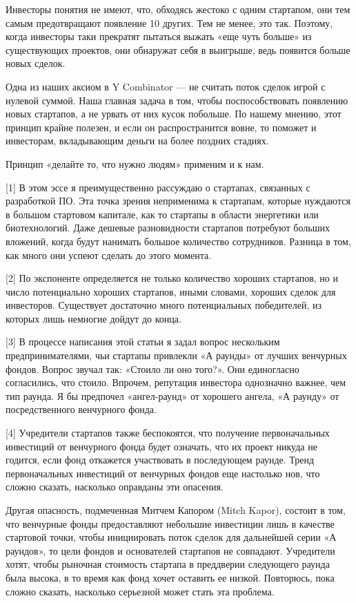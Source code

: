\documentclass[ebook,12pt,oneside,openany]{memoir}
\begin{document}
Инвесторы понятия не имеют, что, обходясь жестоко с одним стартапом,
они тем самым предотвращают появление 10 других. Тем не менее, это
так. Поэтому, когда инвесторы таки прекратят пытаться выжать «еще чуть
больше» из существующих проектов, они обнаружат себя в выигрыше, ведь
появится больше новых сделок.

Одна из наших аксиом в Y Combinator — не считать поток сделок игрой с
нулевой суммой. Наша главная задача в том, чтобы поспособствовать
появлению новых стартапов, а не урвать от них кусок побольше. По
нашему мнению, этот принцип крайне полезен, и если он распространится
вовне, то поможет и инвесторам, вкладывающим деньги на более поздних
стадиях.

Принцип «делайте то, что нужно людям» применим и к нам.

[1] В этом эссе я преимущественно рассуждаю о стартапах, связанных с
разработкой ПО. Эта точка зрения неприменима к стартапам, которые
нуждаются в большом стартовом капитале, как то стартапы в области
энергетики или биотехнологий. Даже дешевые разновидности стартапов
потребуют больших вложений, когда будут нанимать большое количество
сотрудников. Разница в том, как много они успеют сделать до этого
момента.

[2] По экспоненте определяется не только количество хороших стартапов,
но и число потенциально хороших стартапов, иными словами, хороших
сделок для инвесторов. Существует достаточно много потенциальных
победителей, из которых лишь немногие дойдут до конца.

[3] В процессе написания этой статьи я задал вопрос нескольким
предпринимателями, чьи стартапы привлекли «А раунды» от лучших
венчурных фондов. Вопрос звучал так: «Стоило ли оно того?». Они
единогласно согласились, что стоило. Впрочем, репутация инвестора
однозначно важнее, чем тип раунда. Я бы предпочел «ангел-раунд» от
хорошего ангела, «А раунду» от посредственного венчурного фонда.

[4] Учредители стартапов также беспокоятся, что получение
первоначальных инвестиций от венчурного фонда будет означать, что их
проект никуда не годится, если фонд откажется участвовать в
последующем раунде. Тренд первоначальных инвестиций от венчурных
фондов еще настолько нов, что сложно сказать, насколько оправданы эти
опасения.

Другая опасность, подмеченная Митчем Капором (Mitch Kapor), состоит в
том, что венчурные фонды предоставляют небольшие инвестиции лишь в
качестве стартовой точки, чтобы инициировать поток сделок для
дальнейшей серии «А раундов», то цели фондов и основателей стартапов
не совпадают. Учредители хотят, чтобы рыночная стоимость стартапа в
преддверии следующего раунда была высока, в то время как фонд хочет
оставить ее низкой. Повторюсь, пока сложно сказать, насколько
серьезной может стать эта проблема.
\end{document}
